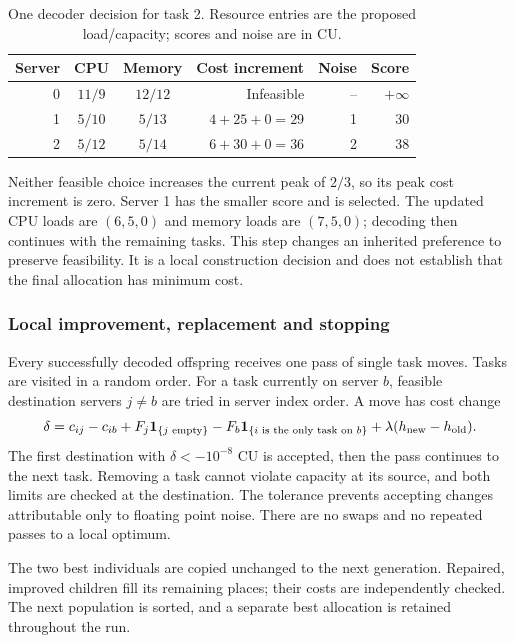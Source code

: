 \documentclass[10pt,a4paper]{article}
\begin{document}
\begin{table}[htbp]
\centering
\small
\caption{One decoder decision for task 2. Resource entries are the proposed
load/capacity; scores and noise are in CU.}
\label{tab:decoder-step}
\begin{tabular}{rccrrr}
\toprule
Server & CPU & Memory & Cost increment & Noise & Score \\
\midrule
0 & $11/9$ & $12/12$ & Infeasible & -- & $+\infty$ \\
1 & $5/10$ & $5/13$ & $4+25+0=29$ & 1 & 30 \\
2 & $5/12$ & $5/14$ & $6+30+0=36$ & 2 & 38 \\
\bottomrule
\end{tabular}
\end{table}
\FloatBarrier

Neither feasible choice increases the current peak of $2/3$, so its peak
cost increment is zero. Server 1 has the smaller score and is selected.
The updated CPU loads are $(6,5,0)$ and memory loads are $(7,5,0)$;
decoding then continues with the remaining tasks. This step changes an
inherited preference to preserve feasibility. It is a local construction
decision and does not establish that the final allocation has minimum cost.

\subsubsection{Local improvement, replacement and stopping}

Every successfully decoded offspring receives one pass of single task moves.
Tasks are visited in a random order. For a task currently on server $b$, feasible
destination servers $j\ne b$ are tried in server index order. A move has cost change
\[
\delta= c_{ij}-c_{ib}
 +F_j\mathbf{1}_{\{j\text{ empty}\}}
 -F_b\mathbf{1}_{\{i\text{ is the only task on }b\}}
 +\lambda(h_{\rm new}-h_{\rm old}).
\]
The first destination with $\delta<-10^{-8}$ CU is accepted, then the pass
continues to the next task. Removing a task cannot violate capacity at its
source, and both limits are checked at the destination. The tolerance prevents
accepting changes attributable only to floating point noise. There are no swaps
and no repeated passes to a local optimum.

The two best individuals are copied unchanged to the next generation. Repaired,
improved children fill its remaining places; their costs are independently
checked. The next population is sorted, and a separate best allocation is
retained throughout the run.
\end{document}
